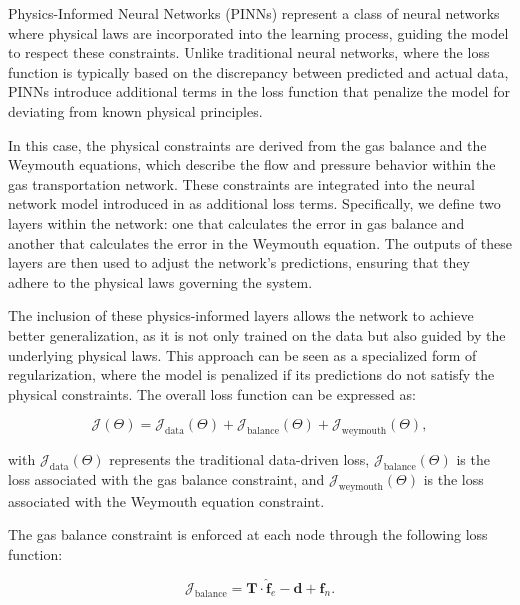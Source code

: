 Physics-Informed Neural Networks (PINNs) represent a class of neural networks where physical laws are incorporated into the learning process, guiding the model to respect these constraints. Unlike traditional neural networks, where the loss function is typically based on the discrepancy between predicted and actual data, PINNs introduce additional terms in the loss function that penalize the model for deviating from known physical principles.

In this case, the physical constraints are derived from the gas balance and the Weymouth equations, which describe the flow and pressure behavior within the gas transportation network. These constraints are integrated into the neural network model introduced in  as additional loss terms. Specifically, we define two layers within the network: one that calculates the error in gas balance and another that calculates the error in the Weymouth equation. The outputs of these layers are then used to adjust the network's predictions, ensuring that they adhere to the physical laws governing the system.

The inclusion of these physics-informed layers allows the network to achieve better generalization, as it is not only trained on the data but also guided by the underlying physical laws. This approach can be seen as a specialized form of regularization, where the model is penalized if its predictions do not satisfy the physical constraints. The overall loss function can be expressed as:

\begin{equation}
   \mathcal{J}(\Theta) = \mathcal{J}_{\text{data}}(\Theta) +  \mathcal{J}_{\text{balance}}(\Theta) +  \mathcal{J}_{\text{weymouth}}(\Theta),     
    \label{eq:PINN_basic_definition}
\end{equation}

\noindent with \( \mathcal{J}_{\text{data}}(\Theta) \) represents the traditional data-driven loss, \( \mathcal{J}_{\text{balance}}(\Theta) \) is the loss associated with the gas balance constraint, and \( \mathcal{J}_{\text{weymouth}}(\Theta) \) is the loss associated with the Weymouth equation constraint. 



The gas balance constraint is enforced at each node through the following loss function:

\begin{equation} \label{eq:gas_balance_GNN}
\mathcal{J}_{\text{balance}} =  \mathbf{T} \cdot \hat{\mathbf{f}}_e - \mathbf{d} + \hat{\mathbf{f}}_n .
\end{equation}

